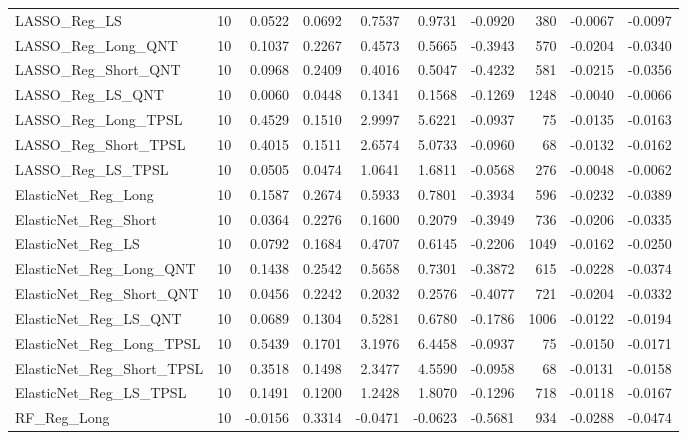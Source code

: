 \begin{tabular}{llrrrrrrrr}
\cline{1-10}
LASSO\_Reg\_LS & 10 & 0.0522 & 0.0692 & 0.7537 & 0.9731 & -0.0920 & 380 & -0.0067 & -0.0097 \\
\cline{1-10}
LASSO\_Reg\_Long\_QNT & 10 & 0.1037 & 0.2267 & 0.4573 & 0.5665 & -0.3943 & 570 & -0.0204 & -0.0340 \\
\cline{1-10}
LASSO\_Reg\_Short\_QNT & 10 & 0.0968 & 0.2409 & 0.4016 & 0.5047 & -0.4232 & 581 & -0.0215 & -0.0356 \\
\cline{1-10}
LASSO\_Reg\_LS\_QNT & 10 & 0.0060 & 0.0448 & 0.1341 & 0.1568 & -0.1269 & 1248 & -0.0040 & -0.0066 \\
\cline{1-10}
LASSO\_Reg\_Long\_TPSL & 10 & 0.4529 & 0.1510 & 2.9997 & 5.6221 & -0.0937 & 75 & -0.0135 & -0.0163 \\
\cline{1-10}
LASSO\_Reg\_Short\_TPSL & 10 & 0.4015 & 0.1511 & 2.6574 & 5.0733 & -0.0960 & 68 & -0.0132 & -0.0162 \\
\cline{1-10}
LASSO\_Reg\_LS\_TPSL & 10 & 0.0505 & 0.0474 & 1.0641 & 1.6811 & -0.0568 & 276 & -0.0048 & -0.0062 \\
\cline{1-10}
ElasticNet\_Reg\_Long & 10 & 0.1587 & 0.2674 & 0.5933 & 0.7801 & -0.3934 & 596 & -0.0232 & -0.0389 \\
\cline{1-10}
ElasticNet\_Reg\_Short & 10 & 0.0364 & 0.2276 & 0.1600 & 0.2079 & -0.3949 & 736 & -0.0206 & -0.0335 \\
\cline{1-10}
ElasticNet\_Reg\_LS & 10 & 0.0792 & 0.1684 & 0.4707 & 0.6145 & -0.2206 & 1049 & -0.0162 & -0.0250 \\
\cline{1-10}
ElasticNet\_Reg\_Long\_QNT & 10 & 0.1438 & 0.2542 & 0.5658 & 0.7301 & -0.3872 & 615 & -0.0228 & -0.0374 \\
\cline{1-10}
ElasticNet\_Reg\_Short\_QNT & 10 & 0.0456 & 0.2242 & 0.2032 & 0.2576 & -0.4077 & 721 & -0.0204 & -0.0332 \\
\cline{1-10}
ElasticNet\_Reg\_LS\_QNT & 10 & 0.0689 & 0.1304 & 0.5281 & 0.6780 & -0.1786 & 1006 & -0.0122 & -0.0194 \\
\cline{1-10}
ElasticNet\_Reg\_Long\_TPSL & 10 & 0.5439 & 0.1701 & 3.1976 & 6.4458 & -0.0937 & 75 & -0.0150 & -0.0171 \\
\cline{1-10}
ElasticNet\_Reg\_Short\_TPSL & 10 & 0.3518 & 0.1498 & 2.3477 & 4.5590 & -0.0958 & 68 & -0.0131 & -0.0158 \\
\cline{1-10}
ElasticNet\_Reg\_LS\_TPSL & 10 & 0.1491 & 0.1200 & 1.2428 & 1.8070 & -0.1296 & 718 & -0.0118 & -0.0167 \\
\cline{1-10}
RF\_Reg\_Long & 10 & -0.0156 & 0.3314 & -0.0471 & -0.0623 & -0.5681 & 934 & -0.0288 & -0.0474 \\

\end{tabular}
